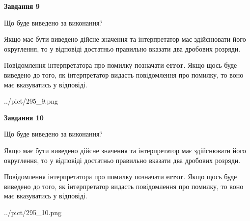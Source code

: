 \documentclass[12pt, ukrainian]{article}
\begin{document}
{\begin {Large}
{\begin {center}\textbf{Завдання 9}\end {center}}\par
Що буде виведено за виконання? \par

Якщо має бути виведено дійсне значення та інтерпретатор має здійснювати його округлення, 
то у відповіді достатньо правильно вказати два дробових розряди.

Повідомлення інтерпретатора про помилку позначати \textbf{error}.
Якщо щось буде виведено до того, як інтерпретатор видасть повідомлення про помилку, 
то воно має вказуватись у відповіді. \par

\begin{center}
	{../pict/295_9.png}
\end{center}
\newpage

{\begin {center}\textbf{Завдання 10}\end {center}}\par
Що буде виведено за виконання? \par

Якщо має бути виведено дійсне значення та інтерпретатор має здійснювати його округлення, 
то у відповіді достатньо правильно вказати два дробових розряди.

Повідомлення інтерпретатора про помилку позначати \textbf{error}.
Якщо щось буде виведено до того, як інтерпретатор видасть повідомлення про помилку, 
то воно має вказуватись у відповіді. \par

\begin{center}
	{../pict/295_10.png}
\end{center}
\newpage

\end {Large}}
\end{document}
